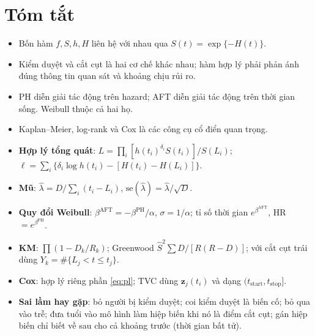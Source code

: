 \documentclass[11pt,a4paper,notitlepage]{report}
\begin{document}
\section*{Tóm tắt}

\begin{itemize}[leftmargin=1.4em]
\item Bốn hàm $f,S,h,H$ liên hệ với nhau qua $S(t)=\exp\{-H(t)\}$.
\item Kiểm duyệt và cắt cụt là hai cơ chế khác nhau; hàm hợp lý phải phản ánh đúng thông tin quan sát và khoảng chịu rủi ro.
\item PH diễn giải tác động trên hazard; AFT diễn giải tác động trên thời gian sống. Weibull thuộc cả hai họ.
\item Kaplan--Meier, log-rank và Cox là các công cụ cổ điển quan trọng.
\end{itemize}

\begin{bosung}
\begin{itemize}[leftmargin=1.4em,itemsep=1pt]
\item \textbf{Hợp lý tổng quát}: $L=\prod_i[h(t_i)^{\delta_i}S(t_i)]/S(L_i)$; $\ell=\sum_i\{\delta_i\log h(t_i)-[H(t_i)-H(L_i)]\}$.
\item \textbf{Mũ}: $\hat\lambda=D/\sum_i(t_i-L_i)$, $\mathrm{se}(\hat\lambda)=\hat\lambda/\sqrt D$.
\item \textbf{Quy đổi Weibull}: $\beta^{\mathrm{AFT}}=-\beta^{\mathrm{PH}}/\alpha$, $\sigma=1/\alpha$; tỉ số thời gian $e^{\beta^{\mathrm{AFT}}}$, HR $=e^{\beta^{\mathrm{PH}}}$.
\item \textbf{KM}: $\prod(1-D_k/R_k)$; Greenwood $\hat S^2\sum D/[R(R-D)]$; với cắt cụt trái dùng $Y_k=\#\{L_j<t\le t_j\}$.
\item \textbf{Cox}: hợp lý riêng phần \eqref{eq:pl}; TVC dùng $\bm z_j(t_i)$ và dạng $(t_{\mathrm{start}},t_{\mathrm{stop}}]$.
\item \textbf{Sai lầm hay gặp}: bỏ người bị kiểm duyệt; coi kiểm duyệt là biến cố; bỏ qua vào trễ; đưa tuổi vào mô hình làm hiệp biến khi nó là điểm cắt cụt; gán hiệp biến chỉ biết về sau cho cả khoảng trước (thời gian bất tử).
\end{itemize}
\end{bosung}
\end{document}

